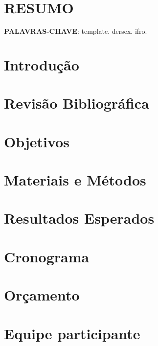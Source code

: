 \documentclass[12pt,openright,twoside,a4paper,english,brazil]{article}
\begin{document}
	\begin{center}
		\textbf{\MakeUppercase{\the\titulo}}
	\end{center}

	\begin{flushright}
		\the\autores
	\end{flushright}

	\section*{RESUMO}

	\noindent\textbf{PALAVRAS-CHAVE}: template. dersex. ifro.
	
	\section{Introdução}

	\section{Revisão Bibliográfica}

	\section{Objetivos}

	\section{Materiais e Métodos}

	\section{Resultados Esperados}

	\section{Cronograma}

	\section{Orçamento}

	\section{Equipe participante}

	
\end{document}
